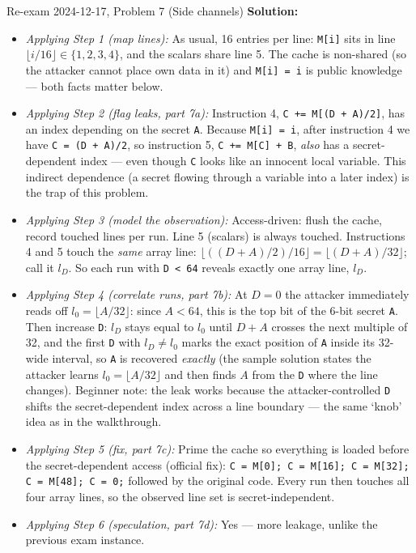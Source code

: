 \documentclass[12pt, a4paper]{article}
\begin{document}
\begin{practicebox}{Re-exam 2024-12-17, Problem 7 (Side channels)}
\textbf{Solution:}
\begin{itemize}
    \item \textit{Applying Step 1 (map lines):} As usual, 16 entries per line: \texttt{M[i]} sits in line $\lfloor i/16 \rfloor \in \{1,2,3,4\}$, and the scalars share line 5. The cache is non-shared (so the attacker cannot place own data in it) and \texttt{M[i] = i} is public knowledge --- both facts matter below.
    \item \textit{Applying Step 2 (flag leaks, part 7a):} Instruction 4, \texttt{C += M[(D + A)/2]}, has an index depending on the secret \texttt{A}. Because \texttt{M[i] = i}, after instruction 4 we have \texttt{C = (D + A)/2}, so instruction 5, \texttt{C += M[C] + B}, \emph{also} has a secret-dependent index --- even though \texttt{C} looks like an innocent local variable. This indirect dependence (a secret flowing through a variable into a later index) is the trap of this problem.
    \item \textit{Applying Step 3 (model the observation):} Access-driven: flush the cache, record touched lines per run. Line 5 (scalars) is always touched. Instructions 4 and 5 touch the \emph{same} array line: $\lfloor ((D + A)/2)/16 \rfloor = \lfloor (D + A)/32 \rfloor$; call it $l_D$. So each run with \texttt{D < 64} reveals exactly one array line, $l_D$.
    \item \textit{Applying Step 4 (correlate runs, part 7b):} At $D = 0$ the attacker immediately reads off $l_0 = \lfloor A/32 \rfloor$: since $A < 64$, this is the top bit of the 6-bit secret \texttt{A}.
    Then increase \texttt{D}: $l_D$ stays equal to $l_0$ until $D + A$ crosses the next multiple of 32, and the first \texttt{D} with $l_D \neq l_0$ marks the exact position of \texttt{A} inside its 32-wide interval, so \texttt{A} is recovered \emph{exactly} (the sample solution states the attacker learns $l_0 = \lfloor A/32 \rfloor$ and then finds $A$ from the \texttt{D} where the line changes).
    Beginner note: the leak works because the attacker-controlled \texttt{D} shifts the secret-dependent index across a line boundary --- the same `knob' idea as in the walkthrough.
    \item \textit{Applying Step 5 (fix, part 7c):} Prime the cache so everything is loaded before the secret-dependent access (official fix): \texttt{C = M[0]; C = M[16]; C = M[32]; C = M[48]; C = 0;} followed by the original code. Every run then touches all four array lines, so the observed line set is secret-independent.
    \item \textit{Applying Step 6 (speculation, part 7d):} Yes --- more leakage, unlike the previous exam instance.


\end{itemize}
\end{practicebox}
\end{document}

